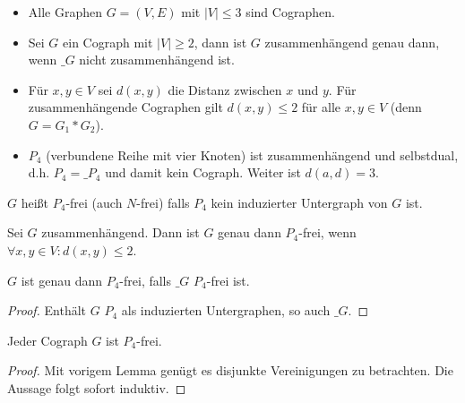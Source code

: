 \begin{nt}
    \begin{itemize}
        \item
            Alle Graphen $G = (V, E)$ mit $|V| \le 3$ sind Cographen.
        \item
            Sei $G$ ein Cograph mit $|V| \ge 2$, dann ist $G$ zusammenhängend genau dann, wenn $\_G$ nicht zusammenhängend ist.
        \item
            Für $x, y \in V$ sei $d(x,y)$ die Distanz zwischen $x$ und $y$.
            Für zusammenhängende Cographen gilt $d(x,y) \le 2$ für alle $x,y \in V$ (denn $G = G_1 \ast G_2$).
        \item
            $P_4$ (verbundene Reihe mit vier Knoten) ist zusammenhängend und selbstdual, d.h. $P_4 = \_{P_4}$ und damit kein Cograph.
            Weiter ist $d(a,d) = 3$.
    \end{itemize}
\end{nt}


\begin{df}
    $G$ heißt $P_4$-frei (auch $N$-frei) falls $P_4$ kein induzierter Untergraph von $G$ ist.
\end{df}

\begin{lem}
    Sei $G$ zusammenhängend.
    Dann ist $G$ genau dann $P_4$-frei, wenn $\forall x,y \in V: d(x,y) \le 2$.
\end{lem}

\begin{lem}
    $G$ ist genau dann $P_4$-frei, falls $\_G$ $P_4$-frei ist.
    \begin{proof}
        Enthält $G$ $P_4$ als induzierten Untergraphen, so auch $\_G$.
    \end{proof}
\end{lem}

\begin{kor}
    Jeder Cograph $G$ ist $P_4$-frei.
    \begin{proof}
        Mit vorigem Lemma genügt es disjunkte Vereinigungen zu betrachten.
        Die Aussage folgt sofort induktiv.
    \end{proof}
\end{kor}

